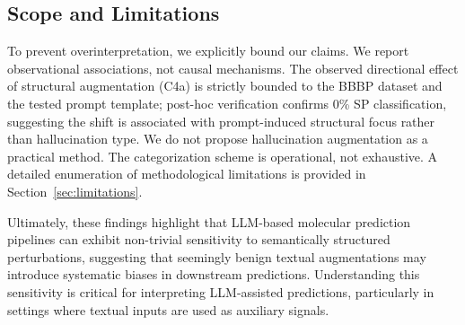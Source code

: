 \subsection{Scope and Limitations}
To prevent overinterpretation, we explicitly bound our claims. We report observational associations, not causal mechanisms. The observed directional effect of structural augmentation (C4a) is strictly bounded to the BBBP dataset and the tested prompt template; post-hoc verification confirms 0\% SP classification, suggesting the shift is associated with prompt-induced structural focus rather than hallucination type. We do not propose hallucination augmentation as a practical method. The categorization scheme is operational, not exhaustive. A detailed enumeration of methodological limitations is provided in Section~\ref{sec:limitations}.

Ultimately, these findings highlight that LLM-based molecular prediction pipelines can exhibit non-trivial sensitivity to semantically structured perturbations, suggesting that seemingly benign textual augmentations may introduce systematic biases in downstream predictions. Understanding this sensitivity is critical for interpreting LLM-assisted predictions, particularly in settings where textual inputs are used as auxiliary signals.
